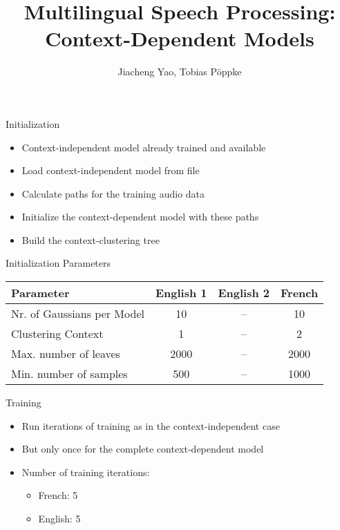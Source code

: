 \documentclass[18pt]{beamer}
\title[Course Report]{Multilingual Speech Processing:\\ Context-Dependent Models}
\author{Jiacheng Yao, Tobias P\"oppke}
\institute{Cognitive Systems Lab}
\begin{document}

\begin{frame}
\titlepage
\end{frame}


\begin{frame}{Initialization}
\begin{itemize}
\item Context-independent model already trained and available
\pause \item Load context-independent model from file
\pause \item Calculate paths for the training audio data
\pause \item Initialize the context-dependent model with these paths
\pause \item Build the context-clustering tree
\end{itemize}
\end{frame}

\begin{frame}{Initialization Parameters}
\begin{table}
\begin{tabular}{l | c | c | c}
Parameter & English 1 & English 2 & French \\ 
\hline \hline
Nr. of Gaussians per Model & 10 & -- & 10 \\
Clustering Context & 1 & -- & 2 \\
Max. number of leaves & 2000 & -- & 2000 \\
Min. number of samples & 500 & -- & 1000
\end{tabular}
\end{table}
\end{frame}


\begin{frame}{Training}
\begin{itemize}
\item Run iterations of training as in the context-independent case
\pause \item But only once for the complete context-dependent model
\pause \item Number of training iterations:
\begin{itemize}
\item French: 5
\item English: 5
\end{itemize}

\end{itemize}
\end{frame}
\end{document}

